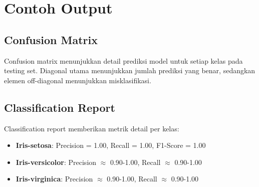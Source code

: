 \documentclass[11pt,a4paper]{article}
\begin{document}
\section{Contoh Output}

\subsection{Confusion Matrix}
Confusion matrix menunjukkan detail prediksi model untuk setiap kelas pada testing set. Diagonal utama menunjukkan jumlah prediksi yang benar, sedangkan elemen off-diagonal menunjukkan misklasifikasi.

\subsection{Classification Report}
Classification report memberikan metrik detail per kelas:
\begin{itemize}
    \item \textbf{Iris-setosa}: Precision = 1.00, Recall = 1.00, F1-Score = 1.00
    \item \textbf{Iris-versicolor}: Precision $\approx$ 0.90-1.00, Recall $\approx$ 0.90-1.00
    \item \textbf{Iris-virginica}: Precision $\approx$ 0.90-1.00, Recall $\approx$ 0.90-1.00
\end{itemize}
\end{document}
